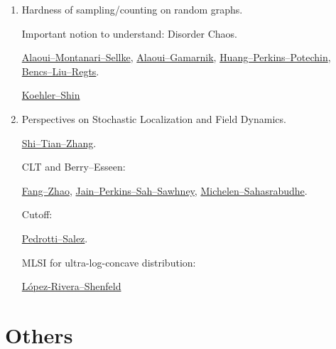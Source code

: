 \documentclass[11pt]{article}
\theoremstyle{plain}
\theoremstyle{definition}
\theoremstyle{remark}
\begin{document}
\begin{enumerate}
Reference: \href{https://arxiv.org/pdf/2508.04133}{Ma--Schramm}, \href{https://arxiv.org/pdf/2404.04668}{Chen--Yang--Yin--Zhang}, \href{https://arxiv.org/pdf/2212.02445}{El Alaoui--Gaitonde},
\href{https://onlinelibrary.wiley.com/doi/abs/10.1002/%28SICI%2910982418%28199712%2911%3A4%3C395%3A%3AAID-RSA7%3E3.0.CO%3B2-U}{Rasmussen}.

\item Hardness of sampling/counting on random graphs.

Important notion to understand: Disorder Chaos.

\href{https://arxiv.org/pdf/2203.05093}{Alaoui--Montanari--Sellke},
\href{https://arxiv.org/pdf/2407.16627}{Alaoui--Gamarnik},
\href{https://arxiv.org/pdf/2409.03974}{Huang--Perkins--Potechin},
\href{https://arxiv.org/pdf/2507.15616}{Bencs--Liu--Regts}.

\href{https://arxiv.org/pdf/2511.18666}{Koehler--Shin}


\item Perspectives on Stochastic Localization and Field Dynamics.

\href{https://arxiv.org/pdf/2510.04460v1}{Shi--Tian--Zhang}.

CLT and Berry--Esseen:

\href{https://arxiv.org/pdf/2511.06196}{Fang--Zhao}, 
\href{https://arxiv.org/pdf/2108.01161}{Jain--Perkins--Sah--Sawhney}, 
\href{https://arxiv.org/pdf/1908.09020}{Michelen--Sahasrabudhe}.

Cutoff:

\href{https://arxiv.org/pdf/2509.08560}{Pedrotti--Salez}.

MLSI for ultra-log-concave distribution:

\href{https://arxiv.org/pdf/2407.02359}{López-Rivera--Shenfeld}

\end{enumerate}



\section{Others}
\end{document}

